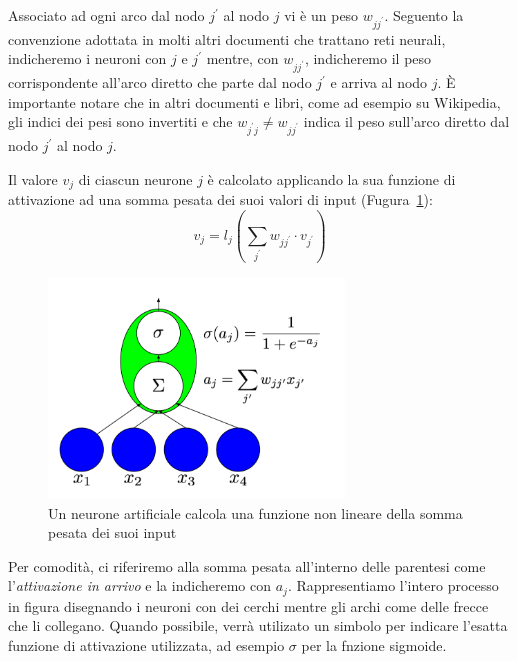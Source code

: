 Associato ad ogni arco dal nodo $j^{'}$ al nodo $j$ vi \`e un peso $w_{jj^{'}}$. Seguento la convenzione adottata in molti altri documenti che trattano reti neurali, indicheremo i neuroni con $j$ e $j^{'}$ mentre, con $w_{jj^{'}}$, indicheremo il peso corrispondente all'arco diretto che parte dal nodo $j^{'}$ e arriva al nodo $j$.
\`E importante notare che in altri documenti e libri, come ad esempio su Wikipedia, gli indici dei pesi sono invertiti e che $w_{j^{'}j} \neq w_{jj^{'}}$ indica il peso sull'arco diretto dal nodo $j^{'}$ al nodo $j$.

Il valore $v_j$ di ciascun neurone $j$ \`e calcolato applicando la sua funzione di attivazione ad una somma pesata dei suoi valori di input (Fugura~\ref{fig:artificialNeuron}): %
\begin{equation} %
  v_j = l_j\left( \sum_{j^{'}} w_{jj^{'}} \cdot v_{j^{'}} \right)
\end{equation}

\begin{figure}[tp]
  \centering
  \begin{center}
    \includegraphics[width=0.7\textwidth]{./images/artificialNeuron.png}
  \end{center}
  \caption{Un neurone artificiale calcola una funzione non lineare della somma pesata dei suoi input}
  \label{fig:artificialNeuron}
\end{figure}
Per comodit\`a, ci riferiremo alla somma pesata all'interno delle parentesi come l'\emph{attivazione in arrivo} e la indicheremo con $a_j$. Rappresentiamo l'intero processo in figura disegnando i neuroni con dei cerchi mentre gli archi come delle frecce che li collegano.
Quando possibile, verr\`a utilizato un simbolo per indicare l'esatta funzione di attivazione utilizzata, ad esempio $\sigma$ per la fnzione sigmoide.

